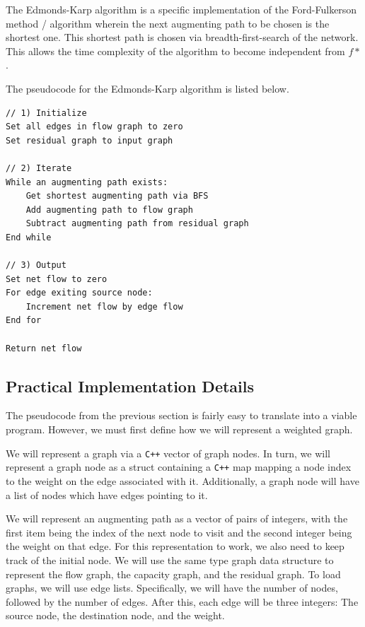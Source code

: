 \documentclass[12pt]{amsart}
\begin{document}
    The Edmonds-Karp algorithm is a specific implementation of
    the Ford-Fulkerson method / algorithm wherein the next
    augmenting path to be chosen is the shortest one. This
    shortest path is chosen via breadth-first-search of the
    network. This allows the time complexity of the algorithm
    to become independent from $f*$.

    The pseudocode for the Edmonds-Karp algorithm is listed
    below.

\begin{verbatim}
// 1) Initialize
Set all edges in flow graph to zero
Set residual graph to input graph

// 2) Iterate
While an augmenting path exists:
    Get shortest augmenting path via BFS
    Add augmenting path to flow graph
    Subtract augmenting path from residual graph
End while

// 3) Output
Set net flow to zero
For edge exiting source node:
    Increment net flow by edge flow
End for

Return net flow
\end{verbatim}

\subsection{Practical Implementation Details}

    The pseudocode from the previous section is fairly easy to
    translate into a viable program. However, we must first
    define how we will represent a weighted graph.

    We will represent a graph via a \verb|C++| vector of graph
    nodes. In turn, we will represent a graph node as a struct
    containing a \verb|C++| map mapping a node index to the
    weight on the edge associated with it. Additionally, a graph
    node will have a list of nodes which have edges pointing to
    it.

    We will represent an augmenting path as a vector of pairs of
    integers, with the first item being the index of the next
    node to visit and the second integer being the weight on
    that edge. For this representation to work, we also need to
    keep track of the initial node. We will use the same type
    graph data structure to represent the flow graph, the
    capacity graph, and the residual graph. To load graphs, we
    will use edge lists. Specifically, we will have the number
    of nodes, followed by the number of edges. After this, each
    edge will be three integers: The source node, the
    destination node, and the weight.
\end{document}
